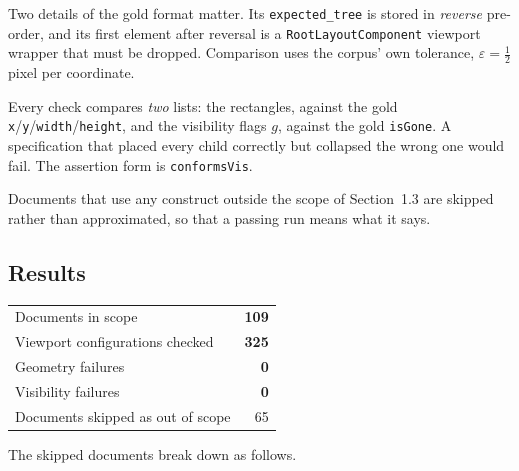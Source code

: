 \documentclass[11pt,a4paper]{article}
\newcommand{\lo}[1]{\texttt{#1}}       %
\newcommand{\jv}[1]{\texttt{#1}}       %
\theoremstyle{definition}
\theoremstyle{plain}
\theoremstyle{remark}
\begin{document}
Two details of the gold format matter. Its \jv{expected\_tree} is stored in
\emph{reverse} pre-order, and its first element after reversal is a
\jv{RootLayoutComponent} viewport wrapper that must be dropped. Comparison uses
the corpus' own tolerance, $\varepsilon = \tfrac12$ pixel per coordinate.

Every check compares \emph{two} lists: the rectangles, against the gold
\jv{x}/\jv{y}/\jv{width}/\jv{height}, and the visibility flags $g$, against the
gold \jv{isGone}. A specification that placed every child correctly but
collapsed the wrong one would fail. The assertion form is \lo{conformsVis}.

Documents that use any construct outside the scope of Section~1.3 are skipped
rather than approximated, so that a passing run means what it says.

\subsection{Results}

\begin{center}
\begin{tabular}{@{}lr@{}}
\toprule
Documents in scope & \textbf{109} \\
Viewport configurations checked & \textbf{325} \\
Geometry failures & \textbf{0} \\
Visibility failures & \textbf{0} \\
Documents skipped as out of scope & 65 \\
\bottomrule
\end{tabular}
\end{center}

\noindent The skipped documents break down as follows.
\end{document}
